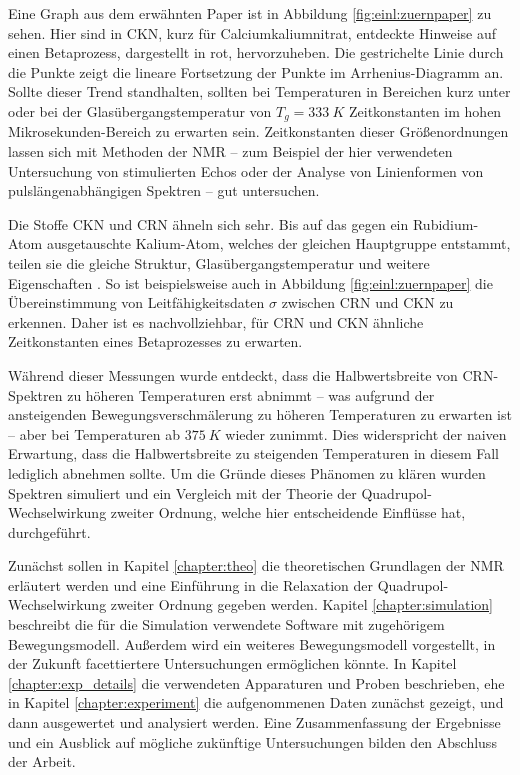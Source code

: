 Eine Graph aus dem erwähnten Paper ist in Abbildung \ref{fig:einl:zuernpaper} zu sehen. Hier sind in CKN, kurz für Calciumkaliumnitrat, entdeckte Hinweise auf einen Betaprozess, dargestellt in rot, hervorzuheben. Die gestrichelte Linie durch die Punkte zeigt die lineare Fortsetzung der Punkte im Arrhenius-Diagramm an. Sollte dieser Trend standhalten, sollten bei Temperaturen in Bereichen kurz unter oder bei der Glasübergangstemperatur von $T_g = \SI{333}{K}$ Zeitkonstanten im hohen Mikrosekunden-Bereich zu erwarten sein. Zeitkonstanten dieser Größenordnungen lassen sich mit Methoden der NMR -- zum Beispiel der hier verwendeten Untersuchung von stimulierten Echos oder der Analyse von Linienformen von pulslängenabhängigen Spektren -- gut untersuchen.

Die Stoffe CKN und CRN ähneln sich sehr. Bis auf das gegen ein Rubidium-Atom ausgetauschte Kalium-Atom, welches der gleichen Hauptgruppe entstammt, teilen sie die gleiche Struktur, Glasübergangstemperatur und weitere Eigenschaften \cite{PIMENOV199793}. So ist beispielsweise auch in Abbildung \ref{fig:einl:zuernpaper} die Übereinstimmung von Leitfähigkeitsdaten $\sigma$ zwischen CRN und CKN zu erkennen. Daher ist es nachvollziehbar, für CRN und CKN ähnliche Zeitkonstanten eines Betaprozesses zu erwarten.

Während dieser Messungen wurde entdeckt, dass die Halbwertsbreite von CRN-Spektren zu höheren Temperaturen erst abnimmt -- was aufgrund der ansteigenden Bewegungsverschmälerung zu höheren Temperaturen zu erwarten ist -- aber bei Temperaturen ab $\SI{375}{K}$ wieder zunimmt. Dies widerspricht der naiven Erwartung, dass die Halbwertsbreite zu steigenden Temperaturen in diesem Fall lediglich abnehmen sollte. Um die Gründe dieses Phänomen zu klären wurden Spektren simuliert und ein Vergleich mit der Theorie der Quadrupol-Wechselwirkung zweiter Ordnung, welche hier entscheidende Einflüsse hat, durchgeführt.


Zunächst sollen in Kapitel \ref{chapter:theo} die theoretischen Grundlagen der NMR erläutert werden und eine Einführung in die Relaxation der Quadrupol-Wechselwirkung zweiter Ordnung gegeben werden. Kapitel \ref{chapter:simulation} beschreibt die für die Simulation verwendete Software mit zugehörigem Bewegungsmodell. Außerdem wird ein weiteres Bewegungsmodell vorgestellt, in der Zukunft facettiertere Untersuchungen ermöglichen könnte. In Kapitel \ref{chapter:exp_details} die verwendeten Apparaturen und Proben beschrieben, ehe in Kapitel \ref{chapter:experiment} die aufgenommenen Daten zunächst gezeigt, und dann ausgewertet und analysiert werden. Eine Zusammenfassung der Ergebnisse und ein Ausblick auf mögliche zukünftige Untersuchungen bilden den Abschluss der Arbeit.
